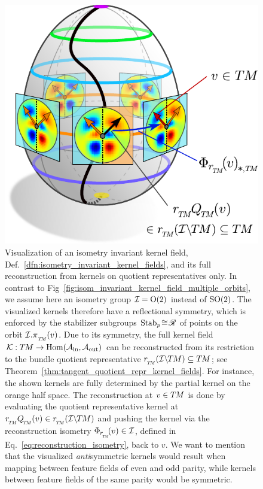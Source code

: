 \begin{figure}
    \centering
    \includegraphics[width=.51\columnwidth]{figures/isometry_egg_quotient_kernel.pdf}
    \captionsetup{width=1.\textwidth}
    \hfill
    \caption{\small
        Visualization of an isometry invariant kernel field, Def.~\ref{dfn:isometry_invariant_kernel_fields}, and its full reconstruction from kernels on quotient representatives only.
        In contrast to Fig~\ref{fig:isom_invariant_kernel_field_multiple_orbits}, we assume here an isometry group $\mathcal{I} = \operatorname{O}(2)$ instead of $\operatorname{SO}(2)$.
        The visualized kernels therefore have a reflectional symmetry, which is enforced by the stabilizer subgroups $\operatorname{Stab}_{p} \!\cong\! \mathscr{R}$ of points on the orbit $\I.\piTM(v)$.
        Due to its symmetry, the full kernel field $\mathcal{K}: T\mkern-1.5muM\to \operatorname{Hom}(\mathcal{A}_\textup{in},\mathcal{A}_\textup{out})$ can be reconstructed from its restriction to the bundle quotient representative $\rTM(\ITM) \subseteq \TM$; see Theorem~\ref{thm:tangent_quotient_repr_kernel_fields}.
        For instance, the shown kernels are fully determined by the partial kernel on the orange half space.
        The reconstruction at $v\in T\mkern-1.5muM$ is done by evaluating the quotient representative kernel at $\rTM\QTM(v) \in \rTM(\ITM)$ and pushing the kernel via the reconstruction isometry $\PhirNoArg(v) \in \I$, defined in Eq.~\eqref{eq:reconstruction_isometry}, back to $v$.
        We want to mention that the visualized \emph{anti}symmetric kernels would result when mapping between feature fields of even and odd parity, while kernels between feature fields of the same parity would be symmetric.
        }
    \label{fig:isom_invariant_kernel_field_quotient}
\end{figure}




